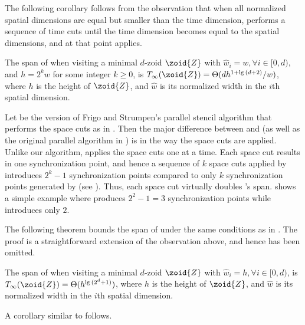 The following corollary follows from the observation
that when all normalized spatial dimensions are equal but
smaller than the time dimension, 
performs a sequence of time cuts until the
time dimension becomes equal to the spatial dimensions,
and at that point 
applies.

\begin{corollary}
The span of  when visiting a minimal $d$-zoid $\zoid{Z}$ 
with ${\widehat{w}}_i = w, \forall{i} \in [0, d)$,
and $h = 2^k w$ for some integer $k \geq 0$,
is $T_{\infty}(\zoid{Z}) = \Theta({ dh^{1 + \lg{(d + 2)}} / w})$, where 
$h$ is the height of $\zoid{Z}$, and
${\widehat{w}}$ is its normalized width in the $i$th 
spatial dimension.
\label{cor:HyperspaceCutSimpleCase}
\end{corollary}

Let  be the version of Frigo and Strumpen's parallel stencil
algorithm \cite{FrigoSt09} that performs the space cuts
as in .
%
Then the major difference between  and  (as
well as the original parallel algorithm in \cite{FrigoSt09}) is in the
way the space cuts are applied.  Unlike our algorithm, 
applies the space cuts one at a time.  Each space cut results in one
synchronization point, and hence a sequence of $k$ space cuts applied
by  introduces $2^k - 1$ synchronization points compared
to only $k$ synchronization points generated by  (see
).  Thus, each space cut virtually doubles
's span.
%
 shows a simple example where  produces
$2^2 - 1 = 3$ synchronization points while  introduces only
$2$.

The following theorem bounds the span of
 under the same conditions as in
.  The proof is a straightforward
extension of the observation above, and hence has been omitted.

\begin{theorem}
  The span of  when visiting a minimal $d$-zoid $\zoid{Z}$ with
  ${\widehat{w}}_i = h, \forall{i} \in [0, d)$, is $T_{\infty}(\zoid{Z})
  = \Theta(h^{\lg{(2^d + 1)}})$, where $h$ is the height of $\zoid{Z}$, and
  ${\widehat{w}}$ is its normalized width in the $i$th spatial
  dimension.
\label{thm:SpaceCutSimpleCase}
\end{theorem}

A corollary similar to 
follows.

